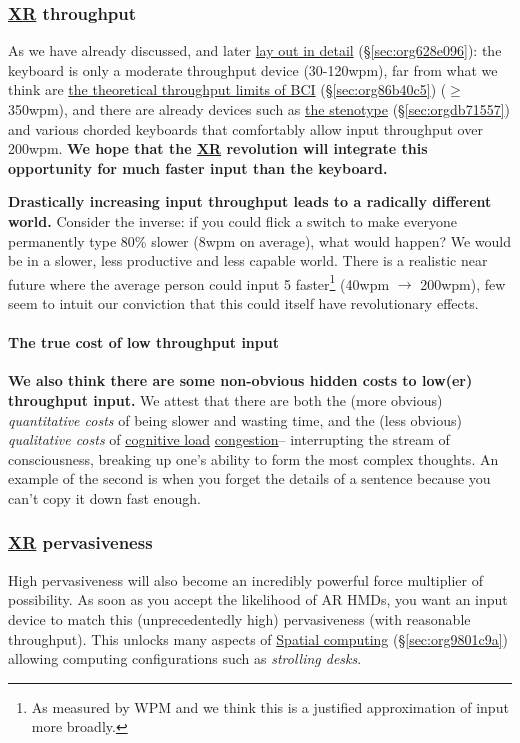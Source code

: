 \documentclass[logo,bsc,singlespacing,parskip]{infthesis}
\begin{document}
\subsubsection{\hyperref[org39cbd51]{XR} throughput}
\label{sec:orgeaf3584}
As we have already discussed, and later \hyperref[sec:org628e096]{lay out in detail} (\S \ref{sec:org628e096}): the keyboard is only a moderate throughput device (30-120wpm), far from what we think are \hyperref[sec:org86b40c5]{the theoretical throughput limits of BCI} (\S \ref{sec:org86b40c5}) (\(\ge\)350wpm), and there are already devices such as \hyperref[sec:orgdb71557]{the stenotype} (\S \ref{sec:orgdb71557}) and various chorded keyboards  that comfortably allow input throughput over 200wpm.
\textbf{We hope that the \hyperref[org39cbd51]{XR} revolution will integrate this opportunity for much faster input than the keyboard.}

\textbf{Drastically increasing input throughput leads to a radically different world.}
Consider the inverse: if you could flick a switch to make everyone permanently type 80\% slower (8wpm on average), what would happen?
We would be in a slower, less productive and less capable world.
There is a realistic near future where the average person could input 5\texttimes{} faster\footnote{As measured by WPM and we think this is a justified approximation of input more broadly.} (40wpm \(\rightarrow\) 200wpm), few seem to intuit our conviction that this could itself have revolutionary effects.
\paragraph{The true cost of low throughput input}
\label{sec:org10cbd04}
\textbf{We also think there are some non-obvious hidden costs to low(er) throughput input.}
We attest that there are both the (more obvious) \emph{quantitative costs} of being slower and wasting time, and the (less obvious) \emph{qualitative costs} of \hyperref[cognitive load]{cognitive load} \hyperref[org99cfbfd]{congestion}-- interrupting the stream of consciousness, breaking up one's ability to form the most complex thoughts.
An example of the second is when you forget the details of a sentence because you can't copy it down fast enough.

\subsubsection{\hyperref[org39cbd51]{XR} pervasiveness}
\label{sec:org4ab3b10}
High pervasiveness will also become an incredibly powerful force multiplier of possibility.
As soon as you accept the likelihood of AR HMDs, you want an input device to match this (unprecedentedly high) pervasiveness (with reasonable throughput).
This unlocks many aspects of \hyperref[sec:org9801c9a]{Spatial computing} (\S \ref{sec:org9801c9a}) allowing computing configurations such as \emph{strolling desks}.
\end{document}
